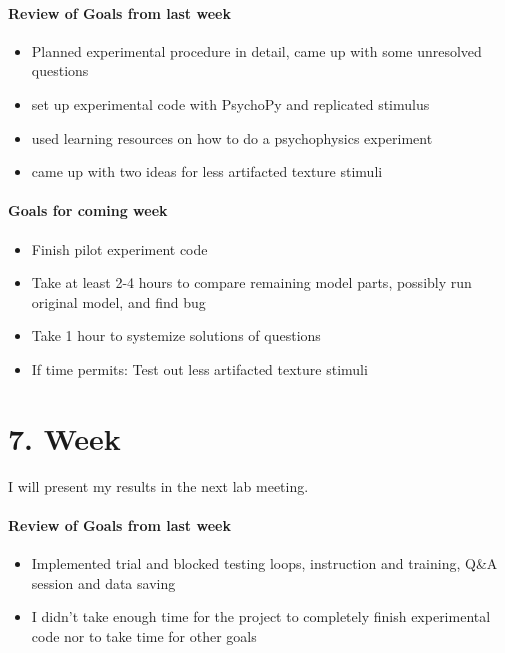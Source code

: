 \paragraph{Review of Goals from last week}
\begin{itemize}
	\item Planned experimental procedure in detail, came up with some unresolved questions
	\item set up experimental code with PsychoPy and replicated stimulus 
	\item used learning resources on how to do a psychophysics experiment
	\item came up with two ideas for less artifacted texture stimuli
\end{itemize}

\paragraph{Goals for coming week}
\begin{itemize}
	\item Finish pilot experiment code
	\item Take at least 2-4 hours to compare remaining model parts, possibly run original model, and find bug
	\item Take 1 hour to systemize solutions of questions
	\item If time permits: Test out less artifacted texture stimuli 
\end{itemize}


\section*{7. Week}
I will present my results in the next lab meeting.
\paragraph{Review of Goals from last week}
\begin{itemize}
	\item Implemented trial and blocked testing loops, instruction and training, Q\&A session and data saving 
	\item I didn't take enough time for the project to completely finish experimental code nor to take time for other goals
\end{itemize}

